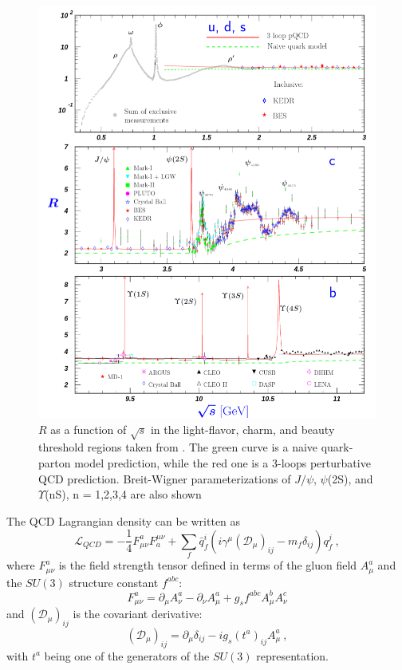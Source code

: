 \begin{figure}[p]
    \centering
    \includegraphics[width=\linewidth]{Figures/Chapter 1/rpp2022-R_udscb.pdf}
    \caption{$R$ as a function of $\sqrt{s}$ in the light-flavor, charm, and beauty threshold regions taken from \cite{pdg}. The green curve is a naive quark-parton model prediction, while the red one is a 3-loops perturbative QCD prediction. Breit-Wigner parameterizations of $J/\psi$, $\psi$(2S), and $\Upsilon$(nS), n = 1,2,3,4 are also shown}
    \label{fig:R_vs_s}
\end{figure}

The QCD Lagrangian density can be written as
\begin{equation}\label{eq:Lqcd}
    \mathcal{L}_{QCD}=-\frac{1}{4} F^a_{\mu\nu}F_a^{\mu\nu} + \sum_f \bar{q}_f^i (i\gamma^\mu(\mathcal{D}_\mu)_{ij}-m_f\delta_{ij})q_f^j\ ,
\end{equation}
where $F^a_{\mu\nu}$ is the field strength tensor defined in terms of the gluon field $A^a_\mu$ and the $SU(3)$ structure constant $f^{abc}$:
\begin{equation} \label{eq:F}
    F^a_{\mu\nu} = \partial_\mu A^a_\nu - \partial_\nu A^a_\mu + g_s f^{abc}A^b_\mu A^c_\nu 
\end{equation}
and $(\mathcal{D}_\mu)_{ij}$ is the covariant derivative:
\begin{equation*}
    (\mathcal{D}_\mu)_{ij} = \partial_\mu \delta_{ij} - ig_s(t^a)_{ij}A_\mu^a\ ,
\end{equation*}
with $t^a$ being one of the generators of the $SU(3)$ representation.

